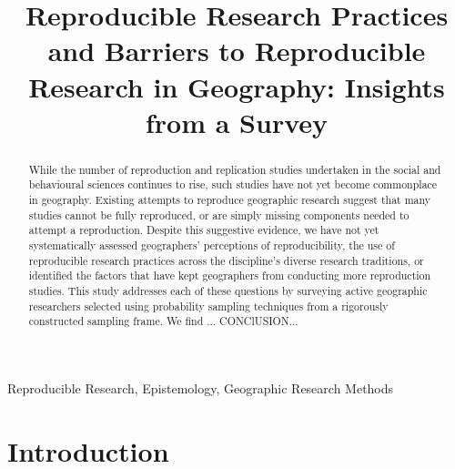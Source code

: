 \documentclass[]{interact}
\theoremstyle{plain}%
\theoremstyle{definition}
\theoremstyle{remark}
\begin{document}

\title{Reproducible Research Practices and Barriers to Reproducible Research in Geography: Insights from a Survey}

\author{
}

\maketitle

\begin{abstract}
While the number of reproduction and replication studies undertaken in the social and behavioural sciences continues to rise, such studies have not yet become commonplace in geography. 
Existing attempts to reproduce geographic research suggest that many studies cannot be fully reproduced, or are simply missing components needed to attempt a reproduction. 
Despite this suggestive evidence, we have not yet systematically assessed geographers' perceptions of reproducibility, the use of reproducible research practices across the discipline's diverse research traditions, or identified the factors that have kept geographers from conducting more reproduction studies.
This study addresses each of these questions by surveying active geographic researchers selected using probability sampling techniques from a rigorously constructed sampling frame.
We find ...
CONClUSION...

\end{abstract}

\begin{keywords}
Reproducible Research, Epistemology, Geographic Research Methods
\end{keywords}

\section*{Introduction}

\newpage
\end{document}
